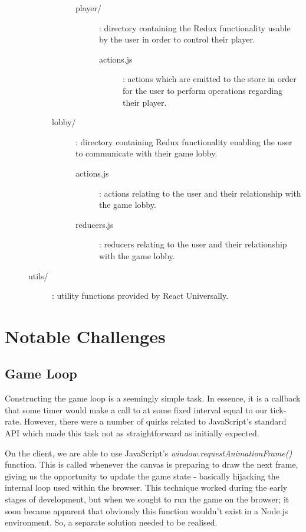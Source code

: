 \documentclass{standalone}
\begin{document}
\begin{formal}
\begin{description}
\begin{description}
\begin{description}
\begin{description}
				      			\item[player/]: directory containing the Redux functionality usable by the user in order to control their player.
						    		\begin{description}
				      				\item[actions.js]: actions which are emitted to the store in order for the user to perform operations regarding their player.
			    					\end{description}
			    				\end{description}

			    				\item[lobby/]: directory containing Redux functionality enabling the user to communicate with their game lobby.
					    		\begin{description}
				      			\item[actions.js]: actions relating to the user and their relationship with the game lobby.
				      			\item[reducers.js]: reducers relating to the user and their relationship with the game lobby.
			    				\end{description}
			    			\end{description}

					    \item[utils/]: utility functions provided by React Universally.
		      	\end{description}
	    \end{description}
    \end{formal}

	\section{Notable Challenges}
		\subsection{Game Loop} \label{sec:gameloopChallenges}
			Constructing the game loop is a seemingly simple task. In essence, it is a callback that some timer would make a call to at some fixed interval equal to our tick-rate. However, there were a number of quirks related to JavaScript's standard API which made this task not as straightforward as initially expected.

			On the client, we are able to use JavaScript's \emph{window.requestAnimationFrame()} \parencite{JsRequestAnimationFrame} function. This is called whenever the canvas is preparing to draw the next frame, giving us the opportunity to update the game state - basically hijacking the internal loop used within the browser. This technique worked during the early stages of development, but when we sought to run the game on the browser; it soon became apparent that obviously this function wouldn't exist in a Node.js environment. So, a separate solution needed to be realised.
\end{document}
